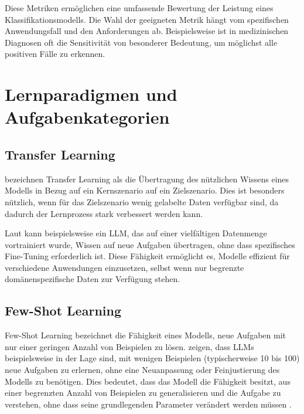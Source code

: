 Diese Metriken ermöglichen eine umfassende Bewertung der Leistung eines Klassifikationsmodells. Die Wahl der geeigneten Metrik hängt vom spezifischen Anwendungsfall und den Anforderungen ab. Beispielsweise ist in medizinischen Diagnosen oft die Sensitivität von besonderer Bedeutung, um möglichst alle positiven Fälle zu erkennen.

\section{Lernparadigmen und Aufgabenkategorien}
\label{sec:lernparadigmen-aufgabenkategorien}

\subsection{Transfer Learning}
\label{subsec:transfer-learning}

\textcite{PanSinnoJialin2010ASoT} bezeichnen Transfer Learning als die Übertragung des nützlichen Wissens eines Modells in Bezug auf ein Kernszenario auf ein Zielszenario. Dies ist besonders nützlich, wenn für das Zielszenario wenig gelabelte Daten verfügbar sind, da dadurch der Lernprozess stark verbessert werden kann.

Laut \textcite{BrownTomB2020LMaF} kann beispielsweise ein \gls{LLM}, das auf einer vielfältigen Datenmenge vortrainiert wurde, Wissen auf neue Aufgaben übertragen, ohne dass spezifisches Fine-Tuning erforderlich ist. Diese Fähigkeit ermöglicht es, Modelle effizient für verschiedene Anwendungen einzusetzen, selbst wenn nur begrenzte domänenspezifische Daten zur Verfügung stehen.

\subsection{Few-Shot Learning}
\label{subsec:few-shot-learning}

Few-Shot Learning bezeichnet die Fähigkeit eines Modells, neue Aufgaben mit nur einer geringen Anzahl von Beispielen zu lösen. \textcite{BrownTomB2020LMaF} zeigen, dass \glspl{LLM} beispielsweise in der Lage sind, mit wenigen Beispielen (typischerweise 10 bis 100) neue Aufgaben zu erlernen, ohne eine Neuanpassung oder Feinjustierung des Modells zu benötigen. Dies bedeutet, dass das Modell die Fähigkeit besitzt, aus einer begrenzten Anzahl von Beispielen zu generalisieren und die Aufgabe zu verstehen, ohne dass seine grundlegenden Parameter verändert werden müssen \parencite{BrownTomB2020LMaF}.

